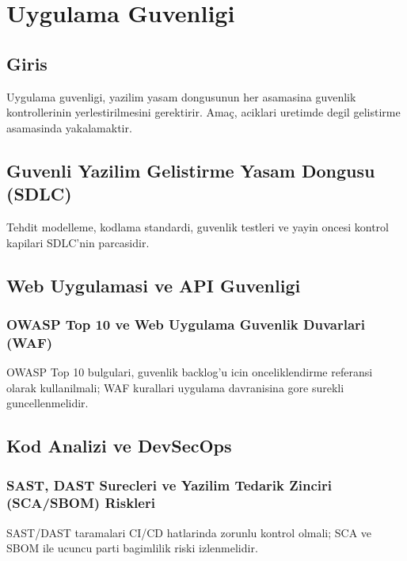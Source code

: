 ﻿\chapter{Uygulama Guvenligi}

\section*{Giris}
Uygulama guvenligi, yazilim yasam dongusunun her asamasina guvenlik kontrollerinin yerlestirilmesini gerektirir. Amaç, aciklari uretimde degil gelistirme asamasinda yakalamaktir.

\section{Guvenli Yazilim Gelistirme Yasam Dongusu (SDLC)}
Tehdit modelleme, kodlama standardi, guvenlik testleri ve yayin oncesi kontrol kapilari SDLC'nin parcasidir.

\section{Web Uygulamasi ve API Guvenligi}
\subsection{OWASP Top 10 ve Web Uygulama Guvenlik Duvarlari (WAF)}
OWASP Top 10 bulgulari, guvenlik backlog'u icin onceliklendirme referansi olarak kullanilmali; WAF kurallari uygulama davranisina gore surekli guncellenmelidir.

\section{Kod Analizi ve DevSecOps}
\subsection{SAST, DAST Surecleri ve Yazilim Tedarik Zinciri (SCA/SBOM) Riskleri}
SAST/DAST taramalari CI/CD hatlarinda zorunlu kontrol olmali; SCA ve SBOM ile ucuncu parti bagimlilik riski izlenmelidir.

